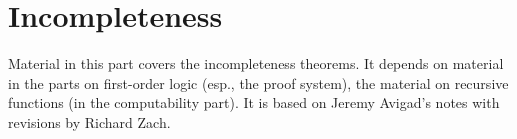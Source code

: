 \documentclass[../../include/open-logic-part]{subfiles}
\begin{document}
\part{Incompleteness}

\begin{editorial}
 Material in this part covers the incompleteness theorems. It depends
 on material in the parts on first-order logic (esp., the proof
 system), the material on recursive functions (in the computability
 part).  It is based on Jeremy Avigad's notes with revisions by Richard Zach.
\end{editorial}





\OLEndPartHook
\end{document}
